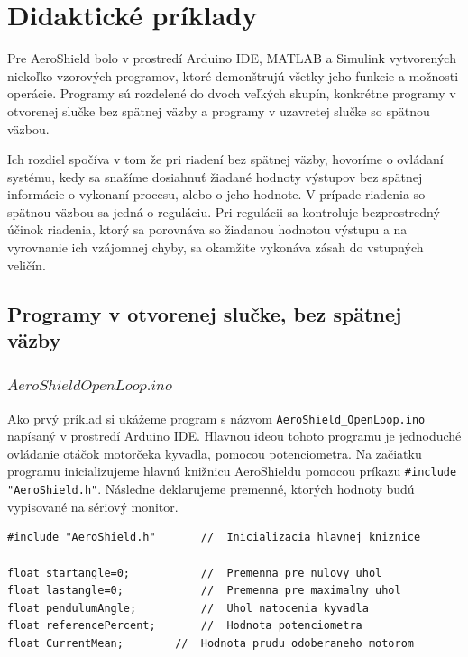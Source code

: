 \chapter{Didaktické príklady}

Pre AeroShield bolo v prostredí Arduino IDE, MATLAB a Simulink vytvorených niekoľko vzorových programov, ktoré demonštrujú všetky jeho funkcie a možnosti operácie. Programy sú rozdelené do dvoch veľkých skupín, konkrétne programy v otvorenej slučke bez spätnej väzby a programy v uzavretej slučke so spätnou väzbou. 

Ich rozdiel spočíva v tom že pri riadení bez spätnej väzby, hovoríme o ovládaní systému, kedy sa snažíme dosiahnuť žiadané hodnoty výstupov bez spätnej informácie o vykonaní procesu, alebo o jeho hodnote. V prípade riadenia so spätnou väzbou sa jedná o reguláciu. Pri regulácii sa kontroluje bezprostredný účinok riadenia, ktorý sa porovnáva so žiadanou hodnotou výstupu a na vyrovnanie ich vzájomnej chyby, sa okamžite vykonáva zásah do vstupných veličín. 

\section{Programy v otvorenej slučke, bez spätnej väzby}
\subsection{$AeroShieldOpenLoop.ino$}

Ako prvý príklad si ukážeme program s názvom \verb|AeroShield_OpenLoop.ino| napísaný v prostredí Arduino IDE. Hlavnou ideou tohoto programu je jednoduché ovládanie otáčok motorčeka kyvadla, pomocou potenciometra. Na začiatku programu inicializujeme hlavnú knižnicu AeroShieldu pomocou príkazu \verb|#include "AeroShield.h"|. Následne deklarujeme premenné, ktorých hodnoty budú vypisované na sériový monitor. 

\begin{lstlisting}[caption={AeroShield open loop dekleracia.},captionpos=b]
#include "AeroShield.h"       //  Inicializacia hlavnej kniznice

float startangle=0;           //  Premenna pre nulovy uhol
float lastangle=0;            //  Premenna pre maximalny uhol 
float pendulumAngle;          //  Uhol natocenia kyvadla
float referencePercent;       //  Hodnota potenciometra
float CurrentMean;	      //  Hodnota prudu odoberaneho motorom 
\end{lstlisting}

